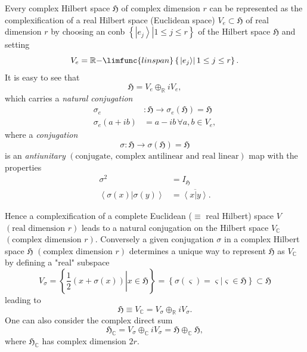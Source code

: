 \documentclass[aps,preprint]{revtex4}
\begin{document}
Every complex Hilbert space $\mathfrak{H}$ of complex dimension $r$ can be
represented as the complexification of a real Hilbert space (Euclidean
space) $V_{e}\subset\mathfrak{H}$ of real dimension $r$ by choosing an conb $%
\left\{ \left. \left\vert e_{j}\right\rangle \right\vert 1\leq j\leq
r\right\} $ of the Hilbert space $\mathfrak{H}$ and setting 
\begin{equation}
V_{e}=\mathbb{R-}\limfunc{linspan}\left\{ \left. \left\vert
e_{j}\right\rangle \right\vert 1\leq j\leq r\right\} .
\end{equation}
It is easy to see that 
\begin{equation}
\mathfrak{H}=V_{e}\oplus_{\mathbb{R}}iV_{e},
\end{equation}
which carries a \emph{natural conjugation }%
\begin{align}
\sigma_{e} & :\mathfrak{H}\rightarrow\sigma_{e}\left( \mathfrak{H}\right) =%
\mathfrak{H} \\
\sigma_{e}\left( a+ib\right) & =a-ib\,\forall a,b\in V_{e},
\end{align}
where a \emph{conjugation} 
\begin{equation}
\sigma:\mathfrak{H}\rightarrow\sigma\left( \mathfrak{H}\right) =\mathfrak{H}
\end{equation}
is an \emph{antiunitary} $\left( \text{conjugate, complex antilinear and
real linear}\right) $ map with the properties 
\begin{align}
\sigma^{2} & =I_{\mathfrak{H}} \\
\left\langle \left. \sigma\left( x\right) \right\vert \sigma\left( y\right)
\right\rangle & =\overline{\left\langle \left. x\right\vert y\right\rangle }.
\end{align}

Hence a complexification of a complete Euclidean ($\equiv$ real Hilbert)
space $V$ $\left( \text{real dimension }r\right) $ leads to a natural
conjugation on the Hilbert space $V_{\mathbb{C}}$ $\left( \text{complex
dimension }r\right) .$ Conversely a given conjugation $\sigma$ in a complex
Hilbert space $\mathfrak{H}$ $\left( \text{complex dimension }r\right) $
determines a unique way to represent $\mathfrak{H}$ as $V_{\mathbb{C}}$ by
defining a "real" subspace 
\begin{equation}
V_{\sigma}=\left\{ \left. \frac{1}{2}\left( x+\sigma\left( x\right) \right)
\right\vert x\in\mathfrak{H}\right\} =\left\{ \left. \sigma\left(
\varsigma\right) =\varsigma\right\vert \varsigma\in\mathfrak{H}\right\}
\subset\mathfrak{H}
\end{equation}
leading to 
\begin{equation}
\mathfrak{H}\equiv V_{\mathbb{C}}=V_{\sigma}\oplus_{\mathbb{R}}iV_{\sigma}.
\end{equation}
One can also consider the complex direct sum 
\begin{equation}
\mathfrak{H}_{\mathbb{C}}=V_{\sigma}\oplus_{\mathbb{C}}iV_{\sigma }=%
\mathfrak{H}\oplus_{\mathbb{C}}\mathfrak{H,}
\end{equation}
where $\mathfrak{H}_{\mathbb{C}}$ has complex dimension $2r.$
\end{document}
